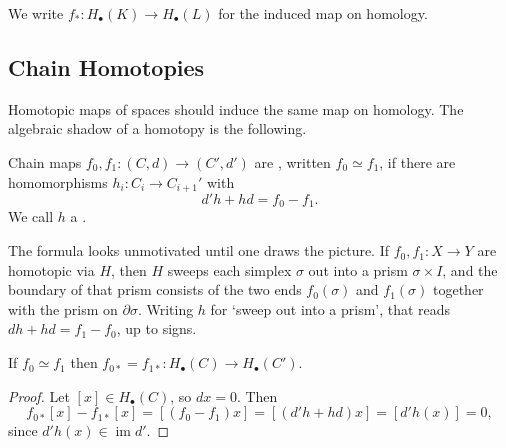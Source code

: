 \documentclass[a4paper]{scrartcl}
\begin{document}
We write $f_* : H_\bullet(K)\to H_\bullet(L)$ for the induced map on homology.

\subsection{Chain Homotopies}

Homotopic maps of spaces should induce the same map on homology. The algebraic shadow of
a homotopy is the following.

\begin{definition}
	Chain maps $f_0, f_1: (C,d)\to(C',d')$ are , written $f_0 \simeq f_1$, if there are homomorphisms $h_i: C_i \to C_{i+1}'$ with
	$$
	d'h + hd = f_0 - f_1 .
	$$
	We call $h$ a .
\end{definition}

The formula looks unmotivated until one draws the picture. If $f_0, f_1: X \to Y$ are
homotopic via $H$, then $H$ sweeps each simplex $\sigma$ out into a prism
$\sigma \times I$, and the boundary of that prism consists of the two ends $f_0(\sigma)$
and $f_1(\sigma)$ together with the prism on $\partial\sigma$. Writing $h$ for `sweep out
into a prism', that reads $dh + hd = f_1 - f_0$, up to signs.

\begin{center}
\end{center}

\begin{lemma} \label{lem:chain-homotopy}
	If $f_0 \simeq f_1$ then $f_{0*} = f_{1*}: H_\bullet(C)\to H_\bullet(C')$.
\end{lemma}
\begin{proof}
	Let $[x]\in H_\bullet(C)$, so $dx = 0$. Then
	$$
	f_{0*}[x]-f_{1*}[x] = [(f_0-f_1)x] = [(d'h+hd)x] = [d'h(x)] = 0,
	$$
	since $d'h(x) \in \operatorname{im}d'$.
\end{proof}
\end{document}
